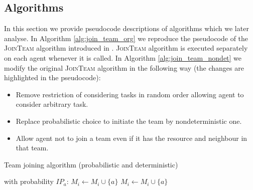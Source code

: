 \documentclass{llncs}
\newcommand{\comment}[1]{{\color{red}{[\sf #1]}}}
\begin{document}
\subsection{Algorithms}

\comment{TL: shall we say something about the whole protocol to give the readers a general picture?}

In this section we provide pseudocode descriptions of algorithms which we later analyse. In Algorithm \ref{alg:join_team_org} we reproduce the pseudocode of the \textsc{JoinTeam} algorithm introduced in \cite{gaston2005agent}. \textsc{JoinTeam} algorithm is executed separately on each agent whenever it is called.  In Algorithm \ref{alg:join_team_nondet} we modify the original \textsc{JoinTeam} algorithm in the following way (the changes are highlighted in the pseudocode):
\begin{itemize}
 \item Remove restriction of considering tasks in random order allowing agent to consider arbitrary task.
 \item Replace probabilistic choice to initiate the team by nondeterministic one.
 \item Allow agent not to join a team even if it has the resource and neighbour in that team.
\end{itemize}



\begin{algorithm}[H]
\caption{Team joining algorithm (probabilistic and deterministic)}
\label{alg:join_team_org}
\begin{scriptsize}
\begin{algorithmic}
     
       
	 
	  \State with probability $IP_a$: $M_i \leftarrow M_i \cup \{a\}$ 
	\EndIf
       
	 
	  \State $M_i \leftarrow M_i \cup \{a\}$ 
	\EndIf
      \EndIf
    \EndIf
  \EndFor
\EndProcedure
\end{algorithmic}
\end{scriptsize}
\end{algorithm}
\end{document}
